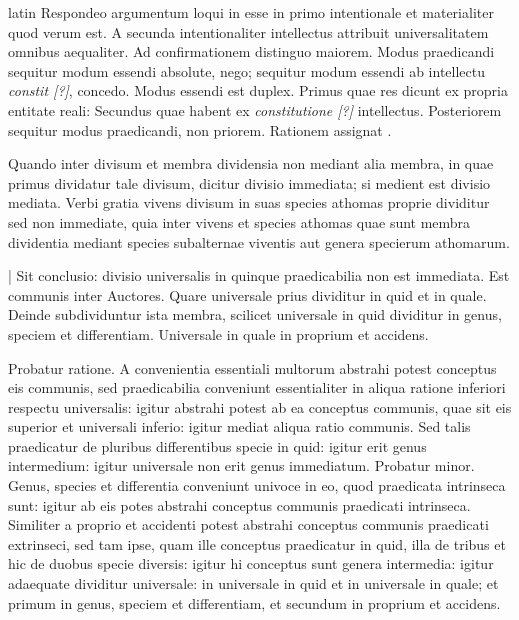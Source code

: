 \begin{otherlanguage*}{latin}
\pstart
  Respondeo argumentum loqui in esse in primo intentionale et materialiter quod verum est. A secunda intentionaliter intellectus attribuit universalitatem omnibus aequaliter. Ad confirmationem distinguo maiorem. Modus praedicandi sequitur modum essendi absolute, nego; sequitur modum essendi ab intellectu \emph{constit [?]}, concedo. Modus essendi est duplex. Primus quae res dicunt ex propria entitate reali: Secundus quae habent ex \emph{constitutione [?]} intellectus. Posteriorem sequitur modus praedicandi, non priorem. Rationem assignat  . 
\pend

        \pstart
        \pend
      
\pstart
  Quando inter divisum et membra dividensia non mediant alia membra, in quae primus dividatur tale divisum, dicitur divisio immediata; si medient est divisio mediata. Verbi gratia vivens divisum in suas species athomas proprie dividitur sed non immediate, quia inter vivens et species athomas quae sunt membra dividentia mediant species subalternae viventis aut genera specierum athomarum. 
\pend

\pstart
  \textnormal{|} Sit conclusio: divisio universalis in quinque praedicabilia non est immediata. Est communis inter Auctores. Quare universale prius dividitur in quid et in quale. Deinde subdividuntur ista membra, scilicet universale in quid dividitur in genus, speciem et differentiam. Universale in quale in proprium et accidens. 
\pend

\pstart
  Probatur ratione. A convenientia essentiali multorum abstrahi potest conceptus eis communis, sed praedicabilia conveniunt essentialiter in aliqua ratione inferiori respectu universalis: igitur abstrahi potest ab ea conceptus communis, quae sit eis superior et universali inferio: igitur mediat aliqua ratio communis. Sed talis praedicatur de pluribus differentibus specie in quid: igitur erit genus intermedium: igitur universale non erit genus immediatum. Probatur minor. Genus, species et differentia conveniunt univoce in eo, quod praedicata intrinseca sunt: igitur ab eis potes abstrahi conceptus communis praedicati intrinseca. Similiter a proprio et accidenti potest abstrahi conceptus communis praedicati extrinseci, sed tam ipse, quam ille conceptus praedicatur in quid, illa de tribus et hic de duobus specie diversis: igitur hi conceptus sunt genera intermedia: igitur adaequate dividitur universale: in universale in quid et in universale in quale; et primum in genus, speciem et differentiam, et secundum in proprium et accidens. 
\pend


\end{otherlanguage*}
